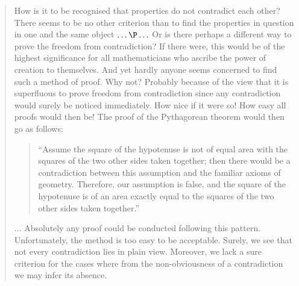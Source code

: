 \documentclass[11pt,fleqn,leqno]{article}
\begin{document}
\begin{quote}
{\footnotesize 
How is it to be recognised that properties do not contradict each other? There seems to be no other criterion than to find the properties in question in one and the same object $\ldots \P \ldots$ Or is there perhaps a different way to prove the freedom from contradiction? If there were, this would be of the highest significance for all mathematicians who ascribe the power of creation to themselves. And yet hardly anyone seems concerned to find such a method of proof. Why not? Probably because of the view that it is superfluous to prove freedom from contradiction since any contradiction would surely be noticed immediately. How nice if it were so! How easy all proofs would then be!
The proof of the Pythagorean theorem would then go as follows:
\begin{quote}
``Assume the square of the hypotenuse is not of equal area with the squares of the two other sides taken together; then there would be a contradiction between this assumption and the familiar axioms of geometry. Therefore, our assumption is false, and the square of the hypotenuse is of an area exactly equal to the squares of the two other sides taken together.''
\end{quote}}

{\footnotesize
$\ldots$ Absolutely any proof could be conducted following this pattern. Unfortunately, the method is too easy to be acceptable. Surely, we see that not every contradiction lies in plain view. Moreover, we lack a sure criterion for the cases where from the non-obviousness of a contradiction we may infer its absence.  \hfill \cite[\S143-\S144]{Frege1903}
}
\end{quote}
\end{document}
